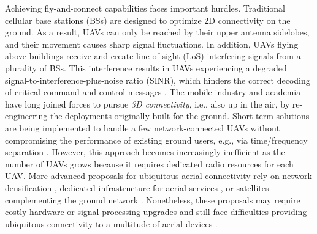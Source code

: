 Achieving fly-and-connect capabilities faces important hurdles. Traditional cellular base stations (BSs) are designed to optimize 2D connectivity on the ground. As a result, UAVs can only be reached by their upper antenna sidelobes, and their movement causes sharp signal fluctuations. In addition, UAVs flying above buildings receive and create line-of-sight (LoS) interfering signals from a plurality of BSs. This interference results in UAVs experiencing a degraded signal-to-interference-plus-noise ratio (SINR), which hinders the correct decoding of critical command and control messages \cite{GerGarGal2018,ZenLyuZha2019}. 
The mobile industry and academia have long joined forces to pursue \emph{3D connectivity}, i.e., also up in the air, by re-engineering the deployments originally built for the ground. Short-term solutions are being implemented to handle a few network-connected UAVs without compromising the performance of existing ground users, e.g., via time/frequency separation \cite{NguAmoWig2018,3GPP36777}. However, this approach becomes increasingly inefficient as the number of UAVs grows because it requires dedicated radio resources for each UAV. 
More advanced proposals for ubiquitous aerial connectivity rely on network densification \cite{GarGerLop2019,KanMezLoz2021,DanGarGer2020,CDALHJTWC22}, dedicated infrastructure for aerial services \cite{GerLopBen2022,KimKimRyu2022,MozLinHay2021}, or satellites complementing the ground network \cite{BenGerLop2022}. Nonetheless, these proposals may require costly hardware or signal processing upgrades and still face difficulties providing ubiquitous connectivity to a multitude of aerial devices \cite{GerGarAza2022}.


